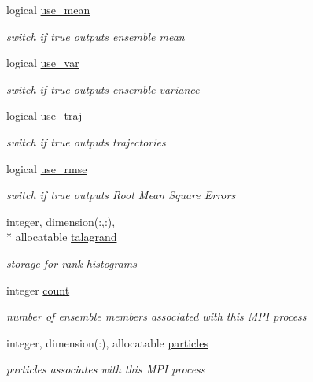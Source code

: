 \begin{DoxyCompactItemize}
logical \hyperlink{structpf__control_1_1pf__control__type_a9fb54b12465d1b75e7337fa7b569cac8}{use\-\_\-mean}
\begin{DoxyCompactList}\small\item\em switch if true outputs ensemble mean \end{DoxyCompactList}\item 
logical \hyperlink{structpf__control_1_1pf__control__type_a0ddc8995c902c77e0a04f70f701f3a5b}{use\-\_\-var}
\begin{DoxyCompactList}\small\item\em switch if true outputs ensemble variance \end{DoxyCompactList}\item 
logical \hyperlink{structpf__control_1_1pf__control__type_a6c3195c3fb580a3d68c0b449a5ce6ab1}{use\-\_\-traj}
\begin{DoxyCompactList}\small\item\em switch if true outputs trajectories \end{DoxyCompactList}\item 
logical \hyperlink{structpf__control_1_1pf__control__type_a47eb88fd006d8ac00206cfd20cd41622}{use\-\_\-rmse}
\begin{DoxyCompactList}\small\item\em switch if true outputs Root Mean Square Errors \end{DoxyCompactList}\item 
integer, dimension(\-:,\-:), \\*
allocatable \hyperlink{structpf__control_1_1pf__control__type_aa35adefc9a96845c065fd01ecf99b37d}{talagrand}
\begin{DoxyCompactList}\small\item\em storage for rank histograms \end{DoxyCompactList}\item 
integer \hyperlink{structpf__control_1_1pf__control__type_a8e26d20b11d6b909dc10731cd3e8d42f}{count}
\begin{DoxyCompactList}\small\item\em number of ensemble members associated with this M\-P\-I process \end{DoxyCompactList}\item 
integer, dimension(\-:), allocatable \hyperlink{structpf__control_1_1pf__control__type_a5a15db12bd5e3ab8163049e4412cf755}{particles}
\begin{DoxyCompactList}\small\item\em particles associates with this M\-P\-I process \end{DoxyCompactList}\item 

\end{DoxyCompactItemize}
